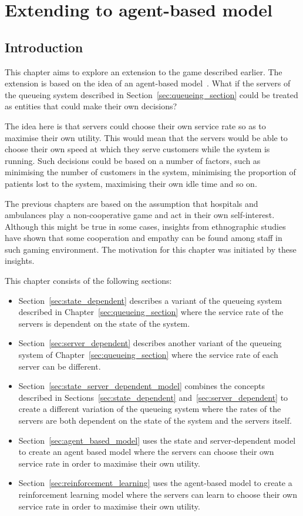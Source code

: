 \chapter{Extending to agent-based model}

\section{Introduction}

This chapter aims to explore an extension to the game described earlier.
The extension is based on the idea of an agent-based
model~\cite{de2014agent, fetta2012peter, knight2012modelling}.
What if the servers of the queueing system described in
Section~\ref{sec:queueing_section} could be treated as entities that could make
their own decisions?

The idea here is that servers could choose their own service rate so as to
maximise their own utility.
This would mean that the servers would be able to choose their own speed at
which they serve customers while the system is running.
Such decisions could be based on a number of factors, such as minimising the
number of customers in the system, minimising the proportion of patients lost
to the system, maximising their own idle time and so on.

The previous chapters are based on the assumption that hospitals and ambulances
play a non-cooperative game and act in their own self-interest.
Although this might be true in some cases, insights from ethnographic
studies~\cite{allen2004understanding} have shown that some cooperation and
empathy can be found among staff in such gaming environment.
The motivation for this chapter was initiated by these insights.

This chapter consists of the following sections:
\begin{itemize}
    \item Section~\ref{sec:state_dependent} describes a variant of the queueing
    system described in Chapter~\ref{sec:queueing_section} where the service
    rate of the servers is dependent on the state of the system.
    \item Section~\ref{sec:server_dependent} describes another variant of the
    queueing system of Chapter~\ref{sec:queueing_section} where the service
    rate of each server can be different.
    \item Section~\ref{sec:state_server_dependent_model} combines the concepts
    described in Sections~\ref{sec:state_dependent}
    and~\ref{sec:server_dependent} to create a different variation of the
    queueing system where the rates of the servers are both dependent on the
    state of the system and the servers itself.
    \item Section~\ref{sec:agent_based_model} uses the state and
    server-dependent model to create an agent based model where the servers
    can choose their own service rate in order to maximise their own utility.
    \item Section~\ref{sec:reinforcement_learning} uses the agent-based model
    to create a reinforcement learning model where the servers can learn to
    choose their own service rate in order to maximise their own utility.
\end{itemize}


